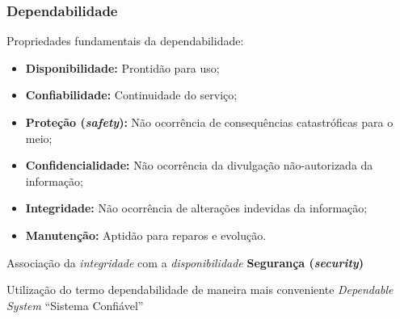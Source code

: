 \documentclass{beamer}
\begin{document}
\begin{frame}
    \frametitle{Dependabilidade}

    Propriedades fundamentais da dependabilidade:

\begin{itemize}
    \small
    \item {\bf Disponibilidade:} Prontidão para uso;
    \item {\bf Confiabilidade:} Continuidade do serviço;
    \item \textbf{Proteção (\textit{safety}):} Não ocorrência de consequências
          catastróficas para o meio;
    \item {\bf Confidencialidade:} Não ocorrência da divulgação não-autorizada
          da informação;
    \item {\bf Integridade:} Não ocorrência de alterações indevidas da
          informação;
    \item {\bf Manutenção:} Aptidão para reparos e evolução.
\end{itemize}

    Associação da {\it integridade} com a {\it disponibilidade} \implica \textbf
    {Segurança (\textit{security})}

    \vspace{0.25cm}

    Utilização do termo dependabilidade de maneira mais conveniente \implica
    {\it Dependable System} \implica ``Sistema Confiável''
\end{frame}
\end{document}
